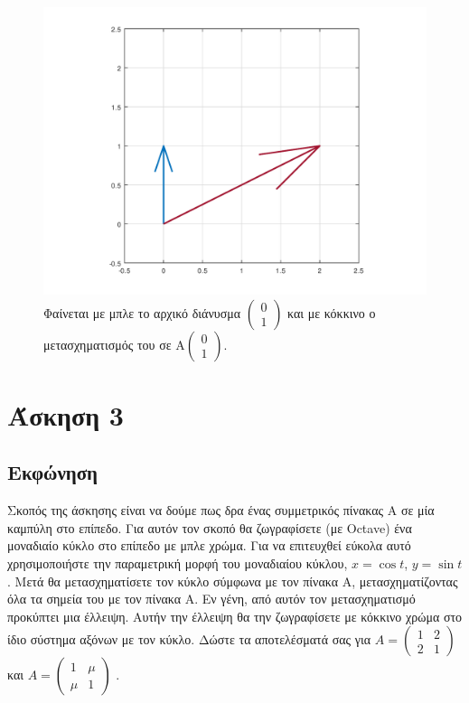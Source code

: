 \documentclass[a4paper,12pt]{article}
\begin{document}
\begin{figure}
    \centering
    \includegraphics[scale=0.6]{x2.png}
    \caption{Φαίνεται με μπλε το αρχικό διάνυσμα
        $
            \begin{pmatrix}
                0 \\
                1
            \end{pmatrix}
        $
        και με κόκκινο ο μετασχηματισμός του σε
        $
            \text{A} \begin{pmatrix}
                0 \\
                1
            \end{pmatrix}
        $.}
\end{figure}
\newpage\section{Άσκηση 3}
\subsection{Εκφώνηση}
Σκοπός της άσκησης είναι να δούμε πως δρα ένας συμμετρικός πίνακας Α σε μία καμπύλη στο επίπεδο.
Για αυτόν τον σκοπό θα ζωγραφίσετε (με Octave) ένα μοναδιαίο κύκλο στο επίπεδο με μπλε χρώμα.
Για να επιτευχθεί εύκολα αυτό χρησιμοποιήστε την παραμετρική μορφή του μοναδιαίου κύκλου, $x=\cos{t}$,
$y=\sin{t}$. Μετά θα μετασχηματίσετε τον κύκλο σύμφωνα με τον πίνακα Α, μετασχηματίζοντας όλα τα σημεία
του με τον πίνακα Α. Εν γένη, από αυτόν τον μετασχηματισμό προκύπτει μια έλλειψη. Αυτήν την έλλειψη θα την
ζωγραφίσετε με κόκκινο χρώμα στο ίδιο σύστημα αξόνων με τον κύκλο. Δώστε τα αποτελέσματά σας για
$
    A=\begin{pmatrix}
        1 & 2 \\
        2 & 1
    \end{pmatrix}
$
και
$
    A=\begin{pmatrix}
        1   & \mu \\
        \mu & 1
    \end{pmatrix}
$
.
\end{document}
